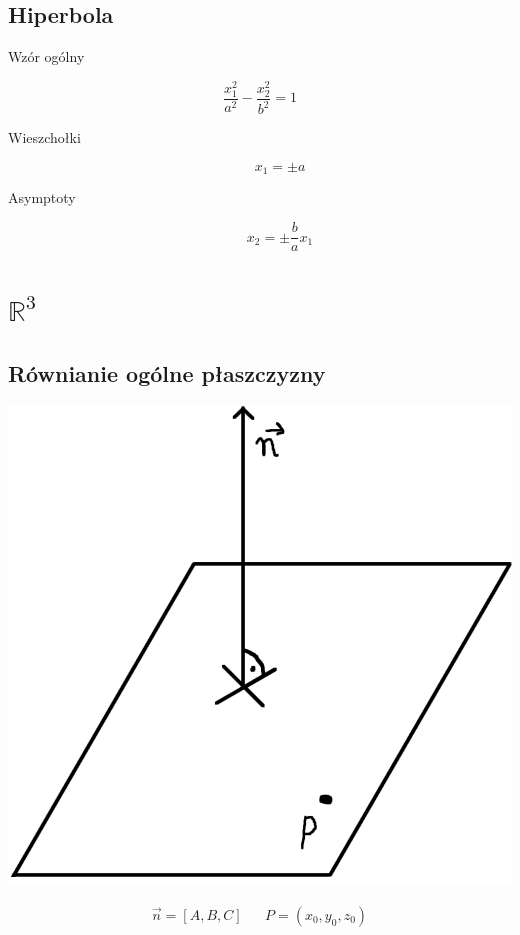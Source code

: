 \documentclass[11pt]{article}
\begin{document}
\subsection{Hiperbola}
\label{sec:org7f4d07e}
\begin{description}
\item[{Wzór ogólny}] 
\end{description}
$$\frac{x_1^2}{a^2}-\frac{x_2^2}{b^2}=1$$
\begin{description}
\item[{Wieszchołki}] $$x_1 = \pm a$$
\item[{Asymptoty}] $$x_2 = \pm \frac{b}{a}x_1$$
\end{description}

\section{\(\mathbb{R}^3\)}
\label{sec:orga974fe9}
\subsection{Równianie ogólne płaszczyzny}
\label{sec:org72c87fc}

\begin{center}
\includegraphics[width=.9\linewidth]{figures/plaszczyzna.png}
\end{center}

\begin{latex}
\begin{align*}
\vec{n}=[A,B,C] && P=(x_{0}, y_{0}, z_{0})
\end{align*}
\end{latex}
\end{document}

